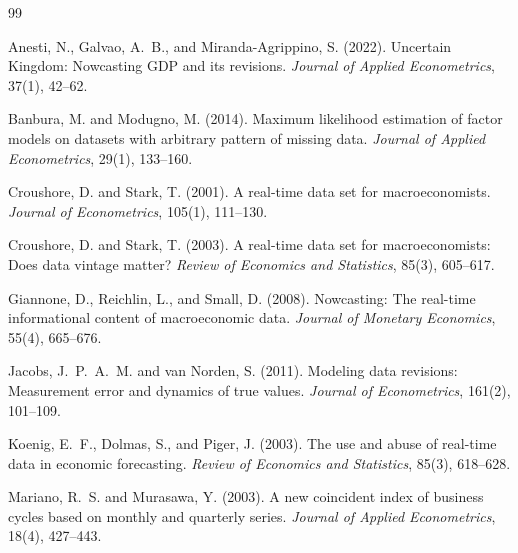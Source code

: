 \documentclass[12pt]{article}
\begin{document}
\begin{thebibliography}{99}

Anesti, N., Galvao, A.~B., and Miranda-Agrippino, S. (2022).
\newblock Uncertain Kingdom: Nowcasting GDP and its revisions.
\newblock \emph{Journal of Applied Econometrics}, 37(1), 42--62.

Banbura, M. and Modugno, M. (2014).
\newblock Maximum likelihood estimation of factor models on datasets with arbitrary pattern of missing data.
\newblock \emph{Journal of Applied Econometrics}, 29(1), 133--160.

Croushore, D. and Stark, T. (2001).
\newblock A real-time data set for macroeconomists.
\newblock \emph{Journal of Econometrics}, 105(1), 111--130.

Croushore, D. and Stark, T. (2003).
\newblock A real-time data set for macroeconomists: Does data vintage matter?
\newblock \emph{Review of Economics and Statistics}, 85(3), 605--617.

Giannone, D., Reichlin, L., and Small, D. (2008).
\newblock Nowcasting: The real-time informational content of macroeconomic data.
\newblock \emph{Journal of Monetary Economics}, 55(4), 665--676.

Jacobs, J.~P.~A.~M. and van Norden, S. (2011).
\newblock Modeling data revisions: Measurement error and dynamics of true values.
\newblock \emph{Journal of Econometrics}, 161(2), 101--109.

Koenig, E.~F., Dolmas, S., and Piger, J. (2003).
\newblock The use and abuse of real-time data in economic forecasting.
\newblock \emph{Review of Economics and Statistics}, 85(3), 618--628.

Mariano, R.~S. and Murasawa, Y. (2003).
\newblock A new coincident index of business cycles based on monthly and quarterly series.
\newblock \emph{Journal of Applied Econometrics}, 18(4), 427--443.

\end{thebibliography}
\end{document}
